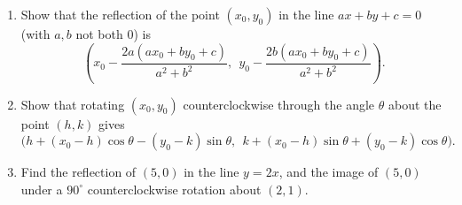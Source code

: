 \begin{enumerate}
\item[(a)] Show that the reflection of the point $(x_0,y_0)$ in the line $ax+by+c=0$ (with $a,b$ not both $0$) is
\[\left(x_0-\dfrac{2a(ax_0+by_0+c)}{a^2+b^2},\ \ y_0-\dfrac{2b(ax_0+by_0+c)}{a^2+b^2}\right).\]
\item[(b)] Show that rotating $(x_0,y_0)$ counterclockwise through the angle $\theta$ about the point $(h,k)$ gives
\[\bigl(h+(x_0-h)\cos\theta-(y_0-k)\sin\theta,\ \ k+(x_0-h)\sin\theta+(y_0-k)\cos\theta\bigr).\]
\item[(c)] Find the reflection of $(5,0)$ in the line $y=2x$, and the image of $(5,0)$ under a $90^\circ$ counterclockwise rotation about $(2,1)$.
\end{enumerate}
